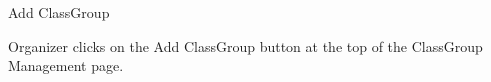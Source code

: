 
\begin{uc}{Add ClassGroup}

    
    \begin{uc-trig}
        Organizer clicks on the Add ClassGroup button at the top of the ClassGroup Management
        page.
    \end{uc-trig}
\end{uc}

